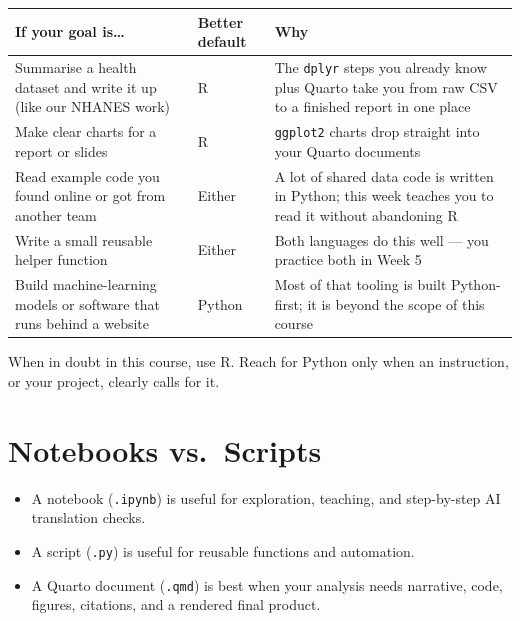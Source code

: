 \documentclass[
  letterpaper,
  DIV=11,
  numbers=noendperiod,
  oneside]{scrreprt}
\providecommand{\tightlist}{%
  \setlength{\itemsep}{0pt}\setlength{\parskip}{0pt}}
\begin{document}
\begin{longtable}[]{@{}
  >{\raggedright\arraybackslash}p{}
  >{\raggedright\arraybackslash}p{}
  >{\raggedright\arraybackslash}p{}@{}}
\toprule\noalign{}
\begin{minipage}[b]{\linewidth}\raggedright
If your goal is\ldots{}
\end{minipage} & \begin{minipage}[b]{\linewidth}\raggedright
Better default
\end{minipage} & \begin{minipage}[b]{\linewidth}\raggedright
Why
\end{minipage} \\
\midrule\noalign{}
\endhead
\bottomrule\noalign{}
\endlastfoot
Summarise a health dataset and write it up (like our NHANES work) & R &
The \texttt{dplyr} steps you already know plus Quarto take you from raw
CSV to a finished report in one place \\
Make clear charts for a report or slides & R & \texttt{ggplot2} charts
drop straight into your Quarto documents \\
Read example code you found online or got from another team & Either & A
lot of shared data code is written in Python; this week teaches you to
read it without abandoning R \\
Write a small reusable helper function & Either & Both languages do this
well --- you practice both in Week 5 \\
Build machine-learning models or software that runs behind a website &
Python & Most of that tooling is built Python-first; it is beyond the
scope of this course \\
\end{longtable}

When in doubt in this course, use R. Reach for Python only when an
instruction, or your project, clearly calls for it.

\section{Notebooks vs.~Scripts}\label{notebooks-vs.-scripts}

\begin{itemize}
\tightlist
\item
  A notebook (\texttt{.ipynb}) is useful for exploration, teaching, and
  step-by-step AI translation checks.
\item
  A script (\texttt{.py}) is useful for reusable functions and
  automation.
\item
  A Quarto document (\texttt{.qmd}) is best when your analysis needs
  narrative, code, figures, citations, and a rendered final product.
\end{itemize}
\end{document}
